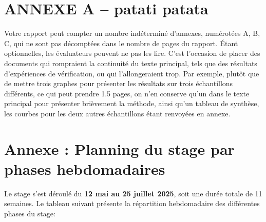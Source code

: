 \section*{ANNEXE A – patati patata}

Votre rapport peut compter un nombre indéterminé d’annexes, numérotées A, B, C, qui ne sont pas décomptées dans le nombre de pages du rapport. Étant optionnelles, les évaluateurs peuvent ne pas les lire. C’est l’occasion de placer des documents qui rompraient la continuité du texte principal, tels que des résultats d’expériences de vérification, ou qui l’allongeraient trop. Par exemple, plutôt que de mettre trois graphes pour présenter les résultats sur trois échantillons différents, ce qui peut prendre 1.5 pages, on n’en conserve qu’un dans le texte principal pour présenter brièvement la méthode, ainsi qu’un tableau de synthèse, les courbes pour les deux autres échantillons étant renvoyées en annexe.



\section*{Annexe : Planning du stage par phases hebdomadaires}

Le stage s’est déroulé du \textbf{12 mai au 25 juillet 2025}, soit une durée totale de 11 semaines. Le tableau suivant présente la répartition hebdomadaire des différentes phases du stage:

\bigskip


